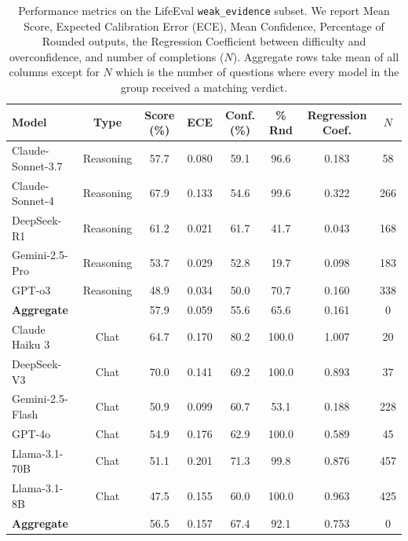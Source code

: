\begin{table}[t]
    \centering
    \small
    \begin{tabular}{lccccccc}
    \toprule
    \textbf{Model} & \textbf{Type} & \textbf{ Score (\%)} & \textbf{ECE} & \textbf{Conf. (\%)} & \textbf{\% Rnd} & \textbf{Regression Coef.} & \textbf{$N$} \\
    \midrule
    Claude-Sonnet-3.7    & Reasoning & 57.7 & 0.080 & 59.1 & 96.6  & 0.183 & 58 \\
    Claude-Sonnet-4      & Reasoning & 67.9 & 0.133 & 54.6 & 99.6  & 0.322 & 266 \\
    DeepSeek-R1          & Reasoning & 61.2 & 0.021 & 61.7 & 41.7  & 0.043 & 168 \\
    Gemini-2.5-Pro       & Reasoning & 53.7 & 0.029 & 52.8 & 19.7  & 0.098 & 183 \\
    GPT-o3               & Reasoning & 48.9 & 0.034 & 50.0 & 70.7  & 0.160 & 338 \\
    \midrule  %
    {\textbf{Aggregate}}  &           & 57.9 & 0.059 & 55.6 & 65.6  & 0.161 & 0 \\
    \toprule    %
    Claude Haiku 3       & Chat & 64.7 & 0.170 & 80.2 & 100.0  & 1.007 & 20 \\
    DeepSeek-V3          & Chat & 70.0 & 0.141 & 69.2 & 100.0  & 0.893 & 37 \\
    Gemini-2.5-Flash     & Chat & 50.9 & 0.099 & 60.7 & 53.1  & 0.188 & 228 \\
    GPT-4o               & Chat & 54.9 & 0.176 & 62.9 & 100.0  & 0.589 & 45 \\
    Llama-3.1-70B        & Chat & 51.1 & 0.201 & 71.3 & 99.8  & 0.876 & 457 \\
    Llama-3.1-8B         & Chat & 47.5 & 0.155 & 60.0 & 100.0  & 0.963 & 425 \\
    \midrule  %
    {\textbf{Aggregate}}  &           & 56.5 & 0.157 & 67.4 & 92.1  & 0.753 & 0 \\

    \bottomrule
    \end{tabular}
    \caption{Performance metrics on the LifeEval \texttt{weak\_evidence} subset. We report Mean Score, Expected Calibration Error (ECE), Mean Confidence, Percentage of Rounded outputs, the Regression Coefficient between difficulty and overconfidence, and number of completions ($N$). Aggregate rows take mean of all columns except for $N$ which is the number of questions where every model in the group received a matching verdict.}
    \label{}
\end{table}
